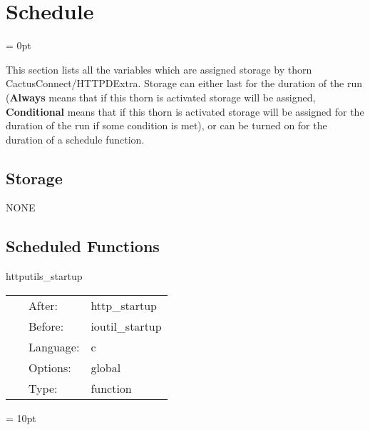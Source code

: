 
\section{Schedule} 


\parskip = 0pt


\noindent This section lists all the variables which are assigned storage by thorn CactusConnect/HTTPDExtra.  Storage can either last for the duration of the run ({\bf Always} means that if this thorn is activated storage will be assigned, {\bf Conditional} means that if this thorn is activated storage will be assigned for the duration of the run if some condition is met), or can be turned on for the duration of a schedule function.


\subsection*{Storage}NONE
\subsection*{Scheduled Functions}
\vspace{5mm}


\hspace{5mm} httputils\_startup 

\hspace{5mm}{\it utils for httpd startup } 


\hspace{5mm}

 \begin{tabular*}{160mm}{cll} 
~ & After:  & http\_startup \\ 
~ & Before:  & ioutil\_startup \\ 
~ & Language:  & c \\ 
~ & Options:  & global \\ 
~ & Type:  & function \\ 
\end{tabular*} 



\vspace{5mm}\parskip = 10pt 
